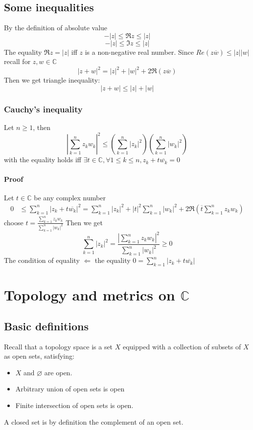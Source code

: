 \documentclass{book}
\newcommand{\abs}[1]{\left\lvert #1 \right\rvert}
\begin{document}
\section{Some inequalities}
By the definition of absolute value
$$-\abs z\leq\Re z\leq\abs z$$
$$-\abs z\leq\Im z\leq\abs z$$
The equality $\Re z=\abs z$ iff $z$ is a non-negative real number. Since $Re(z\overline{w})\leq\abs z\abs w$ recall for $z,w \in \mathbb C$$$\abs{z+w}^2=\abs z^2+\abs w^2+2\Re(z\overline w)$$
Then we get triangle inequality:
$$\abs{z+w}\leq\abs z+\abs w$$
\subsection{Cauchy's inequality}
Let $n\geq 1$, then $$\abs{\sum\limits_{k=1}^nz_kw_k}^2\leq(\sum\limits_{k=1}^n\abs {z_k}^2)(\sum\limits_{k=1}^n\abs {w_k}^2)$$ with the equality holds iff $\exists t\in \mathbb C, \forall 1\leq k\leq n, z_k+t\overline{w_k}=0$
\subsubsection*{Proof}
Let $t\in \mathbb C$ be any complex number
$$\begin{aligned}
    0 &\leq\sum\limits_{k=1}^n\abs{z_k+t\overline {w_k}}^2=\sum\limits_{k=1}^n\abs{z_k}^2+\abs{t}^2\sum\limits_{k=1}^n\abs{w_k}^2+2\Re(\overline t\sum\limits_{k=1}^n z_kw_k)
\end{aligned}$$
choose $t=\frac{\sum\limits_{k=1}^nz_kw_k}{\sum\limits_{k=1}^n\abs{w_k}^2}$
Then we get
$$\sum\limits_{k=1}^n\abs{z_k}^2=\frac{\abs{\sum\limits_{k=1}^nz_kw_k}^2}{\sum\limits_{k=1}^n\abs{w_k}^2}\geq 0$$
The condition of equality $\Leftarrow$ the equality $0=\sum\limits_{k=1}^n\abs{z_k+t\overline {w_k}}$
\chapter{Topology and metrics on $\mathbb C$}
\section{Basic definitions}
Recall that a topology space is a set $X$ equipped with a collection of subsets of $X$ as open sets, satisfying:
\begin{itemize}
    \item $X$ and $\varnothing$ are open.
    \item Arbitrary union of open sets is open
    \item Finite intersection of open sets is open.
\end{itemize}
A closed set is by definition the complement of an open set.
\end{document}
